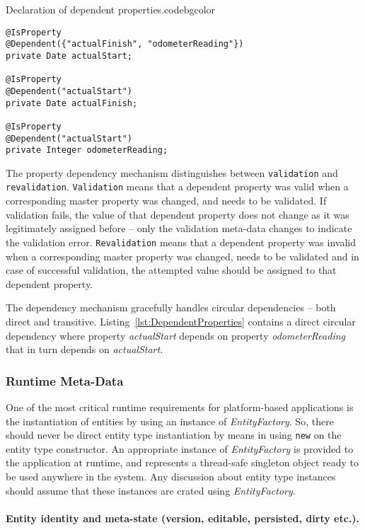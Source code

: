   \begin{code}{Declaration of dependent properties.}{\label{lst:DependentProperties}}{codebgcolor}
    \begin{lstlisting}
@IsProperty
@Dependent({"actualFinish", "odometerReading"})
private Date actualStart;

@IsProperty
@Dependent("actualStart")
private Date actualFinish;

@IsProperty
@Dependent("actualStart")
private Integer odometerReading;
    \end{lstlisting}
  \end{code}

  The property dependency mechanism distinguishes between \texttt{validation} and \texttt{revalidation}.
  \texttt{Validation} means that a dependent property was valid when a corresponding master property was changed, and needs to be validated.
  If validation fails, the value of that dependent property does not change as it was legitimately assigned before -- only the validation meta-data changes to indicate the validation error.
  \texttt{Revalidation} means that a dependent property was invalid when a corresponding master property was changed, needs to be validated and in case of successful validation, the attempted value should be assigned to that dependent property.
  
  The dependency mechanism gracefully handles circular dependencies -- both direct and transitive.
  Listing~\ref{lst:DependentProperties} contains a direct circular dependency where property \emph{actualStart} depends on property \emph{odometerReading} that in turn depends on \emph{actualStart}.
  

\subsubsection{Runtime Meta-Data}
  One of the most critical runtime requirements for platform-based applications is the instantiation of entities by using an instance of \emph{EntityFactory}.
  So, there should never be direct entity type instantiation by means in using \texttt{new} on the entity type constructor.
  An appropriate instance of \emph{EntityFactory} is provided to the application at runtime, and represents a thread-safe singleton object ready to be used anywhere in the system.
  Any discussion about entity type instances should assume that these instances are crated using \emph{EntityFactory}.

  \paragraph*{Entity identity and meta-state (version, editable, persisted, dirty etc.).}

